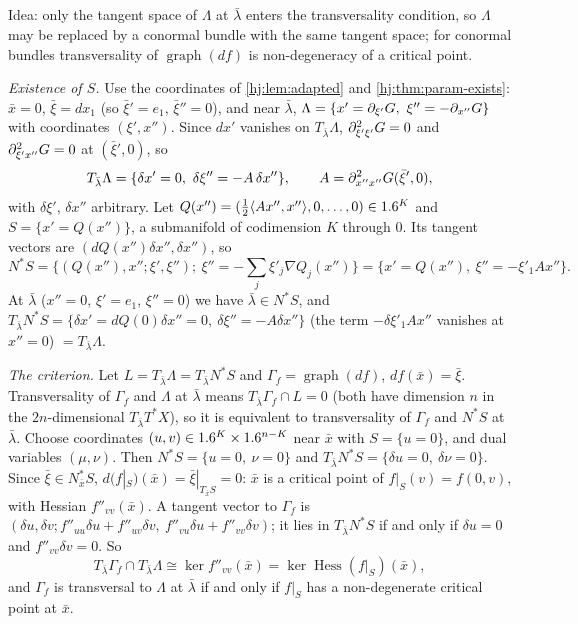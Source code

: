 \subsection*{}
Idea: only the tangent space of $\Lambda$ at $\bar\lambda$ enters the transversality
condition, so $\Lambda$ may be replaced by a conormal bundle with the same tangent space; for
conormal bundles transversality of $\operatorname{graph}(df)$ is non-degeneracy of a critical
point.

\emph{Existence of $S$.} Use the coordinates of \cref{hj:lem:adapted} and
\cref{hj:thm:param-exists}: $\bar x=0$, $\bar\xi=dx_1$ (so $\bar\xi'=e_1$, $\bar\xi''=0$), and
near $\bar\lambda$, $\Lambda=\{x'=\pa_{\xi'}G,\ \xi''=-\pa_{x''}G\}$ with coordinates
$(\xi',x'')$. Since $dx'$ vanishes on $T_{\bar\lambda}\Lambda$, $\partial^2_{\xi'\xi'}G=0$ and
$\partial^2_{\xi'x''}G=0$ at $(\bar\xi',0)$, so
\begin{equation*}
T_{\bar\lambda}\Lambda=\{\delta x'=0,\ \delta\xi''=-A\,\delta x''\},\qquad A=\pa^2_{x''x''}G(\bar
\xi',0),
\end{equation*}
with $\delta\xi'$, $\delta x''$ arbitrary. Let $Q(x'')=(\frac12\langle Ax'',x''\rangle,0,\dots,0)\in1.6^K$
and $S=\{x'=Q(x'')\}$, a submanifold of codimension $K$ through $0$. Its tangent vectors are
$(dQ(x'')\delta x'',\delta x'')$, so
\begin{equation*}
N^*S=\{(Q(x''),x'';\xi',\xi'');\ \xi''=-\textstyle\sum_j\xi'_j\nabla Q_j(x'')\}=
\{x'=Q(x''),\ \xi''=-\xi'_1Ax''\}.
\end{equation*}
At $\bar\lambda$ ($x''=0$, $\xi'=e_1$, $\xi''=0$) we have $\bar\lambda\in N^*S$, and
$T_{\bar\lambda}N^*S=\{\delta x'=dQ(0)\delta x''=0,\ \delta\xi''=-A\delta x''\}$ (the term
$-\delta\xi'_1Ax''$ vanishes at $x''=0$) $=T_{\bar\lambda}\Lambda$.

\emph{The criterion.} Let $L=T_{\bar\lambda}\Lambda=T_{\bar\lambda}N^*S$ and
$\Gamma_f=\operatorname{graph}(df)$, $df(\bar x)=\bar\xi$. Transversality of $\Gamma_f$ and
$\Lambda$ at $\bar\lambda$ means $T_{\bar\lambda}\Gamma_f\cap L=0$ (both have dimension $n$ in
the $2n$-dimensional $T_{\bar\lambda}T^*X$), so it is equivalent to transversality of
$\Gamma_f$ and $N^*S$ at $\bar\lambda$. Choose coordinates $(u,v)\in1.6^K\times1.6^{n-K}$ near
$\bar x$ with $S=\{u=0\}$, and dual variables $(\mu,\nu)$. Then $N^*S=\{u=0,\ \nu=0\}$ and
$T_{\bar\lambda}N^*S=\{\delta u=0,\ \delta\nu=0\}$. Since $\bar\xi\in N^*_{\bar x}S$,
$d(f|_S)(\bar x)=\bar\xi|_{T_{\bar x}S}=0$: $\bar x$ is a critical point of $f|_S(v)=f(0,v)$,
with Hessian $f''_{vv}(\bar x)$. A tangent vector to $\Gamma_f$ is
$(\delta u,\delta v;f''_{uu}\delta u+f''_{uv}\delta v,\ f''_{vu}\delta u+f''_{vv}\delta v)$; it
lies in $T_{\bar\lambda}N^*S$ if and only if $\delta u=0$ and $f''_{vv}\delta v=0$. So
\begin{equation*}
T_{\bar\lambda}\Gamma_f\cap T_{\bar\lambda}\Lambda\cong\ker f''_{vv}(\bar x)=\ker\operatorname{Hess}
(f|_S)(\bar x),
\end{equation*}
and $\Gamma_f$ is transversal to $\Lambda$ at $\bar\lambda$ if and only if $f|_S$ has a
non-degenerate critical point at $\bar x$.

